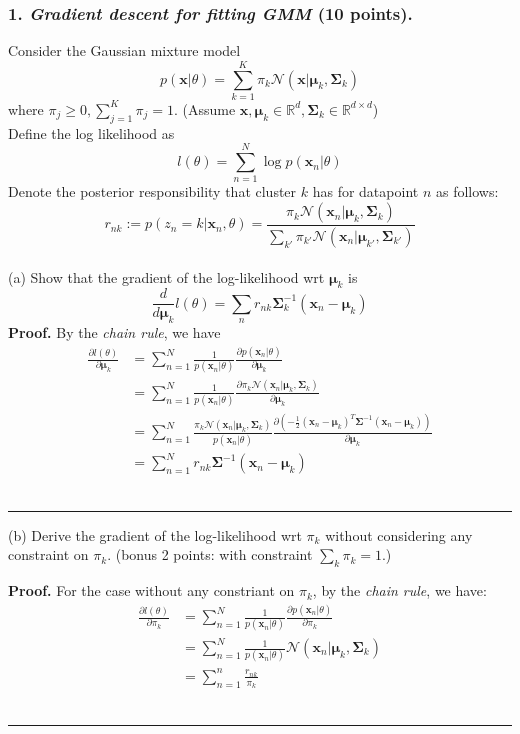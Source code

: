 \documentclass[12pt]{article}%
\newenvironment{proof}[1][Proof]{\textbf{#1.} }{\ \rule{0.5em}{0.5em}}
\newcommand{\PARTIAL}[2]{\frac{\partial #1}{\partial #2}}
\renewcommand{\b}[1]{\boldsymbol{#1}}
\begin{document}
\subsubsection*{1. \textit{Gradient descent for fitting GMM} (10 points).}
Consider the Gaussian mixture model
\[p(\mathbf{x}|\theta)=\sum_{k=1}^K \pi_k \mathcal{N}(\mathbf{x}|\boldsymbol{\mu}_k,\boldsymbol{\Sigma}_k)\]
\indent where $\pi_j\geq 0, \sum_{j=1}^K\pi_j = 1$. (Assume $\mathbf{x},\boldsymbol{\mu}_k\in \mathbb{R}^d,\boldsymbol{\Sigma}_k\in \mathbb{R}^{d\times d}$)
\vspace{1em}
\\
 Define the log likelihood as
\[ l(\theta) = \sum_{n=1}^N \log p(\mathbf{x}_n|\theta)
\]
 Denote the posterior responsibility that cluster $k$ has for datapoint $n$ as follows:
\[
r_{nk}:=p(z_n=k|\mathbf{x}_n,\theta) = \frac{\pi_k\mathcal{N}(\mathbf{x}_n|\boldsymbol{\mu}_k,\boldsymbol{\Sigma}_k)}{\sum_{k'}\pi_{k'}\mathcal{N}(\mathbf{x}_n|\boldsymbol{\mu}_{k'},\boldsymbol{\Sigma}_{k'})}
\]
\\
(a) Show that the gradient of the log-likelihood wrt $\boldsymbol{\mu}_k$ is
	\[ \frac{d}{d\boldsymbol{\mu}_k}l(\theta) = \sum_n r_{nk}\boldsymbol{\Sigma}_k^{-1}(\mathbf{x}_n-\boldsymbol{\mu}_k)
	\]
	\vspace{1em}
    \begin{proof}
        By the {\it chain rule}, we have 
        \begin{align*}
            \PARTIAL{l(\theta)}{\b{\mu}_k}
            &=\sum_{n=1}^N \frac{1}{p(\b{x}_n|\theta)}\PARTIAL{p(\b{x}_n|\theta)}{\b{\mu}_k}\\
            &=\sum_{n=1}^N \frac{1}{p(\b{x}_n|\theta)}\PARTIAL{\pi_k\mathcal{N}(\b{x}_n|\b{\mu}_k,\b{\Sigma}_k)}{\b{\mu}_k}\\
            &=\sum_{n=1}^N \frac{\pi_k\mathcal{N}(\b{x}_n|\b{\mu}_k,\b{\Sigma}_k)}{p(\b{x}_n|\theta)}\PARTIAL{(-\frac{1}{2}(\b{x}_n-\b{\mu}_k)^T\b{\Sigma}^{-1}(\b{x}_n-\b{\mu}_k))}{\b{\mu}_k}\\
            &=\sum_{n=1}^N r_{nk}\b{\Sigma}^{-1}(\b{x}_n-\b{\mu}_k)
        \end{align*}
    \end{proof}
	\vspace{1em}

	(b) Derive the gradient of the log-likelihood wrt $\pi_k$ without considering any constraint on $\pi_k$. (bonus 2 points: with constraint $\sum_k\pi_k=1$.)
	\vspace{1em}

    \begin{proof}
        For the case without any constriant on $\pi_k$, by the {\it chain rule}, we have:
        \begin{align*}
            \PARTIAL{l(\theta)}{\pi_k}
            &=\sum_{n=1}^N \frac{1}{p(\b{x}_n|\theta)}\PARTIAL{p(\b{x}_n|\theta)}{\pi_k}\\
            &=\sum_{n=1}^N \frac{1}{p(\b{x}_n|\theta)}\mathcal{N}(\b{x}_n|\b{\mu}_k,\b{\Sigma}_k)\\
            &=\sum_{n=1}^n \frac{r_{nk}}{\pi_k}
        \end{align*}
    \end{proof}
	\vspace{1em}
\end{document}
